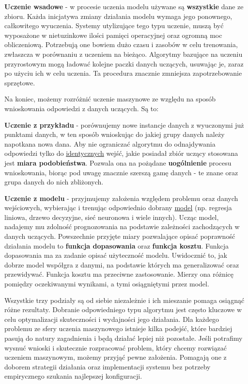\begin{description}
\item \textbf{Uczenie wsadowe} - w procesie uczenia modelu używane są \textbf{wszystkie} dane ze zbioru. 
Każda inicjatywa zmiany działania modelu wymaga jego ponownego, całkowitego wyuczenia. Systemy utylizujące tego typu uczenie, muszą być wyposażone w nietuzinkowe ilości pamięci operacyjnej oraz ogromną moc obliczeniową. Potrzebują one bowiem dużo czasu i zasobów w celu trenowania, zwłaszcza w porównaniu z uczeniem na bieżąco. Algorytmy bazujące na uczeniu przyrostowym mogą ładować kolejne paczki danych uczących, usuwając je, zaraz po użyciu ich w celu uczenia. Ta procedura znacznie zmniejsza zapotrzebowanie sprzętowe.
\end{description}

Na koniec, możemy rozróżnić uczenie maszynowe ze względu na sposób wnioskowania odpowiedzi z danych uczących. Są to:

\begin{description}
\item \textbf{Uczenie z przykładu} - porównujemy nowe instancje danych z wyuczonymi już punktami danych, w ten sposób wnioskując do jakiej grupy danych należy napotkana nowa dana. Aby nie ograniczać algorytmu do odnajdywania odpowiedzi tylko do \underline{identycznych} wejść, jakie posiadał zbiór uczący stosowana jest \textbf{miara podobieństwa}. Pozwala ona na pożądane \textbf{uogólnienie} procesu wnioskowania, biorąc pod uwagę znacznie szerszą gamę danych - te znane oraz grupa danych do nich zbliżonych.

\item \textbf{Uczenie z modelu} - przyjmujemy założenia względem problemu oraz danych wejściowych, wybierając i trenując odpowiednio dobrany \underline{model} (np. regresja liniowa, drzewo decyzyjne, sieć neuronowa i wiele innych). Ucząc model, nadajemy mu zdolność prognozowania na podstawie zależności zachodzących w danych uczących. Powszechnie przyjęte miary pozwalające opisać poprawność działania modelu to \textbf{funkcja dopasowania} oraz \textbf{funkcja kosztu}. Funkcja dopasowania ma za zadanie opisać użyteczność modelu. Uwidocznić to, jak dobrze model współgra z danymi, na podstawie których ma generalizować oraz przewidywać. Funkcja kosztu ma przeciwne zastosowanie. Mierzy ona różnicę pomiędzy oczekiwanymi wynikami, a tymi osiągniętymi przez model.
\end{description}

Wszystkie trzy podziały są od siebie niezależnie i ich mieszanie pomaga osiągnąć różne rezultaty. Dobranie odpowiedniego typu algorytmu jest często kluczowe w celu optymalizacji skuteczności i wydajności jego działania. Dla każdego problemu ze sfery uczenia maszynowego istnieje kilka podejść, które bardziej pasują do natury zagadnienia i będą działać lepiej niż pozostałe. Jeśli potrafimy wysnuć wnioski i skutecznie rozpracować problem, który chcemy rozwiązać uczeniem maszynowym, możemy przyjąć pewne założenia. Pomagają one z doborem strategii działania oraz implementacji systemu bez potrzeby empirycznego szukania najlepszej konfiguracji.

